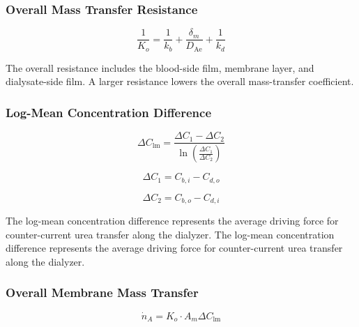 \documentclass[10.5pt]{article}
\begin{document}
\subsubsection{Overall Mass Transfer Resistance}


\begin{equation}
    \frac{1}{K_o} = \frac{1}{k_b} + \frac{\delta_m}{D_{\text{Ae}}} + \frac{1}{k_d}
    \end{equation}

The overall resistance includes the blood-side film, membrane layer, and dialysate-side film. A larger resistance lowers the overall mass-transfer coefficient.

\subsubsection{Log-Mean Concentration Difference}

\vspace{0.1cm}

\begin{equation}
    \Delta C_{\text{lm}} =
    \frac{\Delta C_1-\Delta C_2}
    {\ln\left(\frac{\Delta C_1}{\Delta C_2}\right)}
\end{equation}

\vspace{-0.5cm}

\begin{equation}
    \Delta C_1 = C_{b,i}-C_{d,o}
\end{equation}

\vspace{-0.5cm}

\begin{equation}
    \Delta C_2 = C_{b,o}-C_{d,i}
\end{equation}

The log-mean concentration difference represents the average driving force for counter-current urea transfer along the dialyzer. The log-mean concentration difference represents the average driving force for counter-current urea transfer along the dialyzer.


\subsubsection{Overall Membrane Mass Transfer}

\vspace{0.1cm}

\begin{equation}
    \dot{n}_A = K_o \cdot A_m \Delta C_{\text{lm}}
\end{equation}
\end{document}
